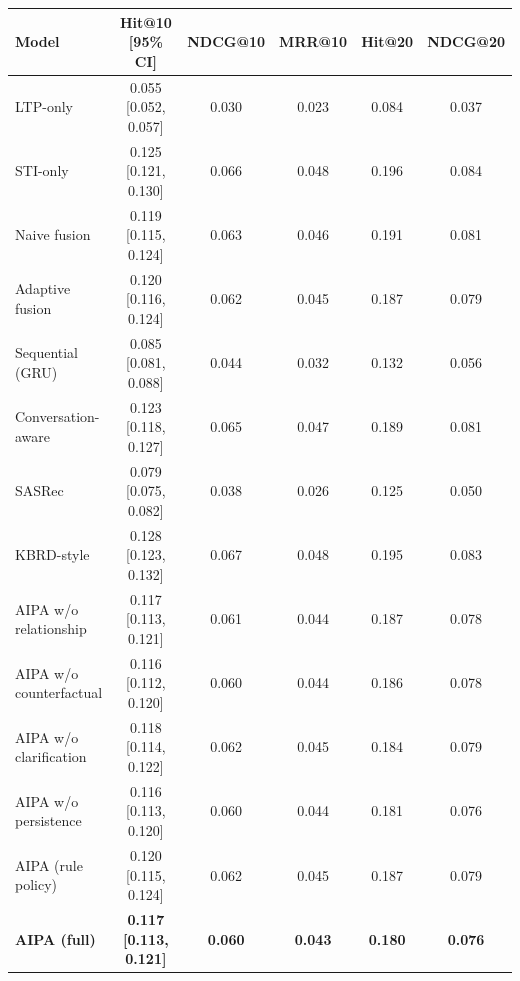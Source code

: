 \begin{tabular}{lccccc}
\toprule
Model & Hit@10 [95\% CI] & NDCG@10 & MRR@10 & Hit@20 & NDCG@20 \\
\midrule
LTP-only & 0.055 [0.052, 0.057] & 0.030 & 0.023 & 0.084 & 0.037 \\
STI-only & 0.125 [0.121, 0.130] & 0.066 & 0.048 & 0.196 & 0.084 \\
Naive fusion & 0.119 [0.115, 0.124] & 0.063 & 0.046 & 0.191 & 0.081 \\
Adaptive fusion & 0.120 [0.116, 0.124] & 0.062 & 0.045 & 0.187 & 0.079 \\
Sequential (GRU) & 0.085 [0.081, 0.088] & 0.044 & 0.032 & 0.132 & 0.056 \\
Conversation-aware & 0.123 [0.118, 0.127] & 0.065 & 0.047 & 0.189 & 0.081 \\
SASRec & 0.079 [0.075, 0.082] & 0.038 & 0.026 & 0.125 & 0.050 \\
KBRD-style & 0.128 [0.123, 0.132] & 0.067 & 0.048 & 0.195 & 0.083 \\
\midrule
AIPA w/o relationship & 0.117 [0.113, 0.121] & 0.061 & 0.044 & 0.187 & 0.078 \\
AIPA w/o counterfactual & 0.116 [0.112, 0.120] & 0.060 & 0.044 & 0.186 & 0.078 \\
AIPA w/o clarification & 0.118 [0.114, 0.122] & 0.062 & 0.045 & 0.184 & 0.079 \\
AIPA w/o persistence & 0.116 [0.113, 0.120] & 0.060 & 0.044 & 0.181 & 0.076 \\
AIPA (rule policy) & 0.120 [0.115, 0.124] & 0.062 & 0.045 & 0.187 & 0.079 \\
\textbf{AIPA (full)} & \textbf{0.117 [0.113, 0.121]} & \textbf{0.060} & \textbf{0.043} & \textbf{0.180} & \textbf{0.076} \\
\bottomrule
\end{tabular}
